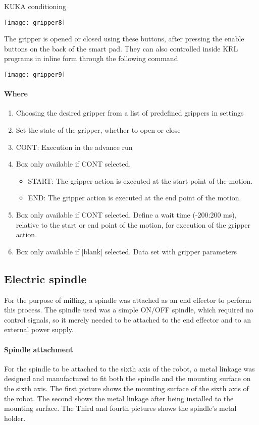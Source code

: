 \documentclass{book}
\begin{document}
\begin{chapter}{KUKA conditioning}
 	\begin{center}
 		\texttt{[image: gripper8]} 
 	\end{center}
 \newline
 The gripper is opened or closed using these buttons, after pressing the enable buttons on the back of the smart pad. They can also controlled inside KRL programs in inline form through the following command
 \begin{center}
 	\texttt{[image: gripper9]}
 \end{center}
 
 	\paragraph{Where}
 	\begin{enumerate}
 		\item Choosing the desired gripper from a list of predefined grippers in settings
 		\item Set the state of the gripper, whether to open or close
 		\item CONT: Execution in the advance run
 		\item Box only available if CONT selected.
 			\begin{itemize}
 				\item START: The gripper action is executed at the start point of the motion.
 				\item END: The gripper action is executed at the end point of the motion.
 			\end{itemize}
 		\item Box only available if CONT selected.
 			Define a wait time (-200:200 ms), relative to the start or end point of the motion, for execution of the gripper action.
 		\item Box only available if [blank] selected.
 		Data set with gripper parameters
 	\end{enumerate}
 
 \subsection{Electric spindle}
 For the purpose of milling, a spindle was attached as an end effector to perform this process. The spindle used was a simple ON/OFF spindle, which required no control signals, so it merely needed to be attached to the end effector and to an external power supply. 
 
 \paragraph{Spindle attachment }
 For the spindle to be attached to the sixth axis of the robot, a metal linkage was designed and manufactured to fit both the spindle and the mounting surface on the sixth axis. The first picture shows the mounting surface of the sixth axis of the robot. The second shows the metal linkage after being installed to the mounting surface. The Third and fourth pictures shows the spindle’s metal holder. 
 

\end{chapter}
\end{document}

